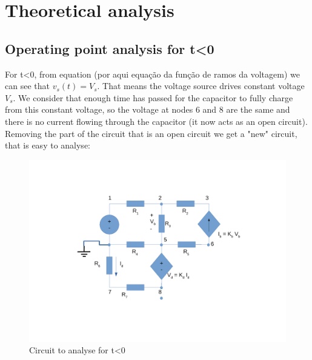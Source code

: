 \section{Theoretical analysis}
\label{sec:ta}
\subsection{Operating point analysis for t<0}
For t<0, from equation (por aqui equação da função de ramos da voltagem) we can see that $v_s (t)= V_s$. That means the voltage source drives constant voltage $V_s$. We consider that enough time has passed for the capacitor to fully charge from this constant voltage, so the voltage at nodes 6 and 8 are the same and there is no current flowing through the capacitor (it now acts as an open circuit). Removing the part of the circuit that is an open circuit we get a "new" circuit, that is easy to analyse: \\
\begin{figure}[h] \centering
\includegraphics[width=0.8\linewidth]{tmenor0.pdf}
\caption{Circuit to analyse for t<0}
\label{fig:zim}
\end{figure}


